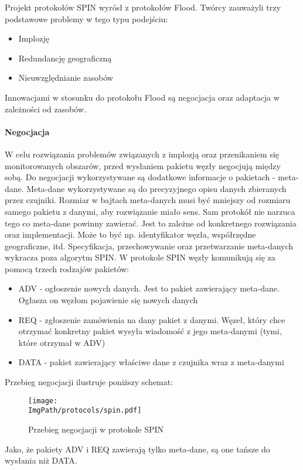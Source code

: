 Projekt protokołów SPIN wyrósł z protokołów Flood. Twórcy zauważyli trzy podstawowe problemy w tego typu podejściu:
\begin{itemize}
	\item Implozję
	\item Redundancję geograficzną
	\item Nieuwzględnianie zasobów
\end{itemize}

Innowacjami w stosunku do protokołu Flood są negocjacja oraz adaptacja w zależności od zasobów.

\paragraph{Negocjacja} W celu rozwiązania problemów związanych z implozją oraz przenikaniem się monitorowanych obszarów, przed wysłaniem pakietu węzły negocjują między sobą. Do negocjacji wykorzystywane są dodatkowe informacje o pakietach - meta-dane. 
Meta-dane wykorzystywane są do precyzyjnego opisu danych zbieranych przez czujniki. Rozmiar w bajtach meta-danych musi być mniejszy od rozmiaru samego pakietu z danymi, aby rozwiązanie miało sens.
Sam protokół nie narzuca tego co meta-dane powinny zawierać. Jest to zależne od konkretnego rozwiązania oraz implementacji. Może to być np. identyfikator węzła, współrzędne geograficzne, itd. Specyfikacja, przechowywanie oraz przetwarzanie meta-danych wykracza poza algorytm SPIN.
W protokole SPIN węzły komunikują się za pomocą trzech rodzajów pakietów:
\begin{itemize}
	\item ADV - ogłoszenie nowych danych. Jest to pakiet zawierający meta-dane. Ogłasza on węzłom pojawienie się nowych danych
	\item REQ - zgłoszenie zamówienia na dany pakiet z danymi. Węzeł, który chce otrzymać konkretny pakiet wysyła wiadomość z jego meta-danymi (tymi, które otrzymał w ADV)
	\item DATA - pakiet zawierający właściwe dane z czujnika wraz z meta-danymi
\end{itemize}
Przebieg negocjacji ilustruje poniższy schemat:
\begin{figure}[H]
	\begin{center}
		\texttt{[image: \\ImgPath/protocols/spin.pdf]}
	\end{center}
	\caption{Przebieg negocjacji w protokole SPIN}
\end{figure}

Jako, że pakiety ADV i REQ zawierają tylko meta-dane, są one tańsze do wysłania niż DATA.

